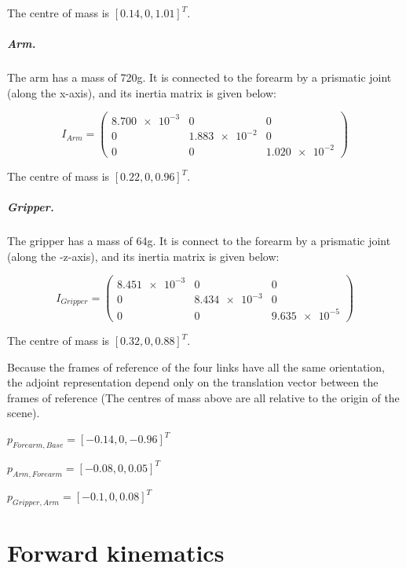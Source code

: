 \documentclass[]{scrreprt}
\begin{document}
The centre of mass is $[0.14,0,1.01]^T$.

\paragraph{Arm.} The arm has a mass of 720g. It is connected to the forearm by a prismatic joint (along the x-axis), and
its inertia matrix is given below:

\[
I_{Arm} = 
\left(
\begin{array}{ccc}
\num{+8.700e-3} & \num{0} & \num{0}\\
\num{0} & \num{+1.883e-2} & \num{0}\\
\num{0} & \num{0} & \num{+1.020e-2}
\end{array}
\right)
\]

The centre of mass is $[0.22,0,0.96]^T$.

\paragraph{Gripper.} The gripper has a mass of 64g. It is connect to the forearm by a prismatic joint (along the -z-axis), and its inertia matrix is given below:

\[
I_{Gripper} = 
\left(
\begin{array}{ccc}
\num{+8.451e-3} & \num{0} & \num{0}\\
\num{0} & \num{+8.434e-3} & \num{0}\\
\num{0} & \num{0} & \num{+9.635e-5}
\end{array}
\right)
\]

The centre of mass is $[0.32,0,0.88]^T$.

Because the frames of reference of the four links have all the same orientation, the adjoint representation depend only on the translation vector between the frames of reference (The centres of mass above are all relative to the origin of the scene).

$p_{Forearm,Base} = [-0.14, 0, -0.96]^T$

$p_{Arm,Forearm} = [-0.08, 0, 0.05]^T$

$p_{Gripper,Arm} = [-0.1, 0, 0.08]^T$

\chapter{Forward kinematics}
\end{document}
